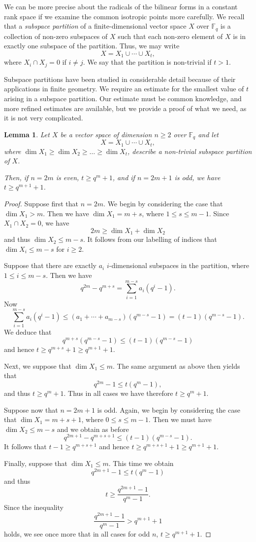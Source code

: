 \documentclass{amsart}
\theoremstyle{plain}
\newtheorem{lemma}{Lemma}
\theoremstyle{definition}
\begin{document}
We can be more precise about  the radicals of the bilinear forms in a constant rank space if we examine the common isotropic points
more carefully. We recall that a \emph{subspace partition} of a finite-dimensional vector space $X$ over $\mathbb{F}_q$ is a collection of non-zero subspaces of $X$ such that each non-zero element of $X$ is in exactly one subspace of the partition. Thus, we may write
\[
 X=X_1 \cup \cdots \cup X_t,
\]
where $X_i\cap X_j=0$ if $i\neq j$. We say that the partition is non-trivial if $t>1$.

Subspace partitions have been studied in considerable detail because of their applications in finite geometry. We require an estimate for the smallest value of $t$ arising in a subspace partition. Our estimate must be common knowledge, and more refined estimates are available,
but we provide a proof of what we need, as it is not very complicated.

\begin{lemma} \label{partition_number}
Let $X$ be a vector space of dimension $n\geq 2$ over  $\mathbb{F}_q$ and let
\[
 X=X_1 \cup \cdots \cup X_t,
\]
where $\dim X_1\geq \dim X_2\geq \ldots \geq \dim X_t$,
describe a non-trivial subspace partition of $X$. 

Then, if $n=2m$ is even, $t\geq q^m+1$, and if $n=2m+1$ is odd, we have $t\geq q^{m+1}+1$.
\end{lemma}

\begin{proof}
 
Suppose first that $n=2m$. We begin by considering the case that $\dim X_1>m$. Then we have $\dim X_1=m+s$, where $1\leq s\leq m-1$. Since
$X_1\cap X_2=0$, we have
\[
 2m\geq \dim X_1+\dim X_2
\]
and thus $\dim X_2\leq m-s$. It follows from our labelling of indices that $\dim X_i\leq m-s$ for $i\geq 2$.

Suppose that there are exactly $a_i$ $i$-dimensional subspaces in the partition, where $1\leq i\leq m-s$. Then we have
\[
 q^{2m}-q^{m+s}=\sum_{i=1}^{m-s} a_i(q^i-1).
\]
Now 
\[
 \sum_{i=1}^{m-s} a_i(q^i-1)\leq (a_1+\cdots +a_{m-s})(q^{m-s}-1)=(t-1)(q^{m-s}-1).
\]
We deduce that
\[
 q^{m+s}(q^{m-s}-1)\leq (t-1)(q^{m-s}-1)
\]
and hence $t\geq q^{m+s}+1\geq q^{m+1}+1$. 

Next, we suppose that $\dim X_1\leq m$. The same argument as above then yields that
\[
 q^{2m}-1\leq t(q^m-1),
\]
and thus $t\geq q^m+1$. Thus in all cases we have therefore $t\geq q^m+1$.

Suppose now that $n=2m+1$ is odd. Again, we begin by considering the case that $\dim X_1=m+s+1$, where $0\leq s\leq m-1$. Then we must have
$\dim X_2\leq m-s$ and we obtain as before
\[
 q^{2m+1}-q^{m+s+1}\leq (t-1)(q^{m-s}-1).
\]
It follows that $t-1\geq q^{m+s+1}$ and hence $t\geq q^{m+s+1}+1\geq q^{m+1}+1$. 

Finally, suppose that $\dim X_1\leq m$. This time we obtain
\[
 q^{2m+1}-1\leq t(q^m-1)
\]
and thus
\[
 t\geq \frac{q^{2m+1}-1}{q^m-1}.
\]
Since the inequality
\[
 \frac{q^{2m+1}-1}{q^m-1}>q^{m+1}+1
\]
holds, we see once more that in all cases for odd $n$, $t\geq q^{m+1}+1$.



\end{proof}
\end{document}
